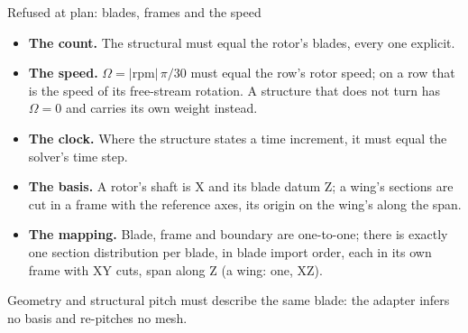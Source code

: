 \begin{frame}{Refused at plan: blades, frames and the speed}
\begin{itemize}\small
  \item \textbf{The count.} The structural  must equal the
        rotor's blades, every one explicit.
  \item \textbf{The speed.} \(\Omega = |\mathrm{rpm}|\,\pi/30\) must equal the
        row's rotor speed; on a  row that is the speed of
        its free-stream rotation. A structure that does not turn has
        \(\Omega = 0\) and carries its own weight instead.
  \item \textbf{The clock.} Where the structure states a time increment, it
        must equal the solver's time step.
  \item \textbf{The basis.} A rotor's shaft is X and its blade datum Z; a
        wing's sections are cut in a frame with the reference axes, its origin
        on the wing's  along the span.
  \item \textbf{The mapping.} Blade, frame and boundary are one-to-one; there
        is exactly one section distribution per blade, in blade import order,
        each in its own frame with XY cuts, span along Z (a wing: one, XZ).
\end{itemize}
{\scriptsize Geometry and structural pitch must describe the same blade: the
adapter infers no basis and re-pitches no mesh.\par}
\end{frame}

